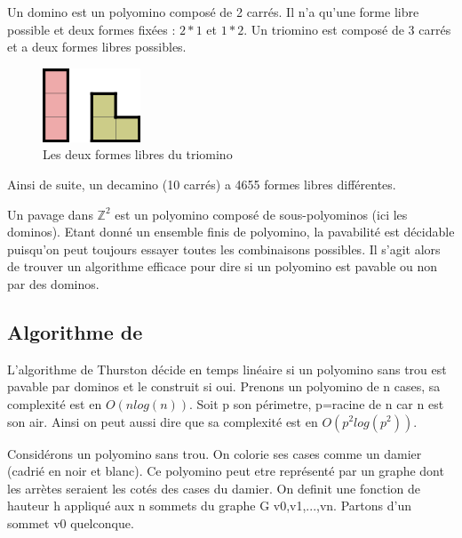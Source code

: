 \documentclass{article}
\begin{document}
\clearpage

\hspace{1cm}

Un domino est un polyomino composé de 2 carrés. Il n’a qu’une forme libre possible et deux formes fixées : $2*1$ et $1*2$.
Un triomino est composé de 3 carrés et a deux formes libres possibles.

\hspace{1cm}

\begin{figure} [!h]
    \center
    \includegraphics [scale=0.5] {image/triomino.png}
    \caption{Les deux formes libres du triomino}
\end{figure}

\hspace{1cm}

Ainsi de suite, un decamino (10 carrés) a 4655 formes libres différentes.

Un pavage dans $\mathbb{Z}^{2}$ est un polyomino composé de sous-polyominos (ici les dominos).
Etant donné un ensemble finis de polyomino, la pavabilité est décidable puisqu'on peut toujours essayer toutes les combinaisons possibles.
Il s'agit alors de trouver un algorithme efficace pour dire si un polyomino est pavable ou non par des dominos.

\newpage

\subsection{Algorithme de }

L'algorithme de Thurston décide en temps linéaire si un polyomino sans trou est pavable par dominos et le construit si oui.
Prenons un polyomino de n cases, sa complexité est en $O\left ( nlog\left ( n \right ) \right )$. Soit p son périmetre, p=racine de n car n est son air.
Ainsi on peut aussi dire que sa complexité est en $O\left ( p^{2}log\left ( p^{2} \right ) \right )$.

Considérons un polyomino sans trou. On colorie ses cases comme un damier (cadrié en noir et blanc). Ce polyomino peut etre représenté par un graphe dont les arrètes seraient les cotés des cases du damier.
On definit une fonction de hauteur h appliqué aux n sommets du graphe G {v0,v1,...,vn}.
Partons d'un sommet v0 quelconque.
\end{document}
